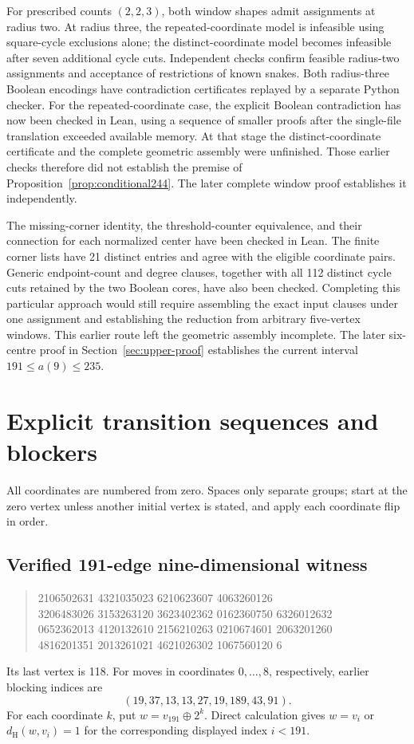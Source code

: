 \documentclass[11pt,a4paper]{article}
\theoremstyle{definition}
\theoremstyle{remark}
\newcommand{\Ham}{d_{\mathrm H}}
\begin{document}
For prescribed counts $(2,2,3)$, both window shapes admit assignments at radius two. At radius three, the repeated-coordinate model is infeasible using square-cycle exclusions alone; the distinct-coordinate model becomes infeasible after seven additional cycle cuts. Independent checks confirm feasible radius-two assignments and acceptance of restrictions of known snakes. Both radius-three Boolean encodings have contradiction certificates replayed by a separate Python checker. For the repeated-coordinate case, the explicit Boolean contradiction has now been checked in Lean, using a sequence of smaller proofs after the single-file translation exceeded available memory. At that stage the distinct-coordinate certificate and the complete geometric assembly were unfinished. Those earlier checks therefore did not establish the premise of Proposition~\ref{prop:conditional244}. The later complete window proof establishes it independently.

The missing-corner identity, the threshold-counter equivalence, and their connection for each normalized center have been checked in Lean. The finite corner lists have 21 distinct entries and agree with the eligible coordinate pairs. Generic endpoint-count and degree clauses, together with all 112 distinct cycle cuts retained by the two Boolean cores, have also been checked. Completing this particular approach would still require assembling the exact input clauses under one assignment and establishing the reduction from arbitrary five-vertex windows. This earlier route left the geometric assembly incomplete. The later six-centre proof in Section~\ref{sec:upper-proof} establishes the current interval $191\le a(9)\le235$.

\section{Explicit transition sequences and blockers}\label{app:witness}
All coordinates are numbered from zero. Spaces only separate groups; start at the zero vertex unless another initial vertex is stated, and apply each coordinate flip in order.
\subsection{Verified 191-edge nine-dimensional witness}
\begin{quote}\small{} 2106502631 4321035023 6210623607 4063260126\\
3206483026 3153263120 3623402362 0162360750 6326012632\\
0652362013 4120132610 2156210263 0210674601 2063201260\\
4816201351 2013261021 4621026302 1067560120 6
\end{quote}
Its last vertex is 118. For moves in coordinates $0,\ldots,8$, respectively, earlier blocking indices are
\[
(19,37,13,13,27,19,189,43,91).
\]
For each coordinate $k$, put $w=v_{191}\mathbin{\oplus}2^k$. Direct calculation gives $w=v_i$ or $\Ham(w,v_i)=1$ for the corresponding displayed index $i<191$.
\end{document}
